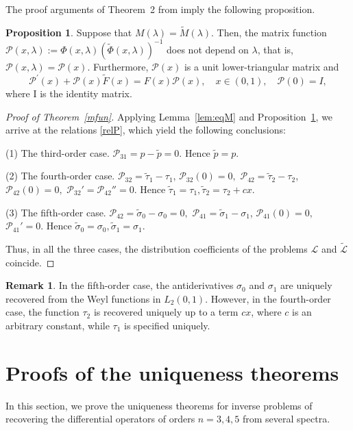 \documentclass[reqno,12pt,centertags]{amsart}
\numberwithin{equation}{section}
\theoremstyle{definition}
\newtheorem{proposition}[theorem]{Proposition}
\newtheorem{remark}{Remark}[section]
\begin{document}
The proof arguments of Theorem~2 from \cite{Bon2} imply the following proposition.

\begin{proposition} \label{prop:P}
Suppose that $M(\lambda) = \tilde M(\lambda)$. Then, the matrix function $\mathcal P(x, \lambda) := \Phi(x, \lambda) (\tilde \Phi(x, \lambda))^{-1}$ does not depend on $\lambda$, that is, $\mathcal P(x, \lambda) = \mathcal P(x)$. Furthermore, $\mathcal P(x)$ is a unit lower-triangular matrix and	
\begin{equation} \label{relP}
\mathcal{P}^{\prime}(x)+\mathcal{P}(x) \tilde{F}(x)=F(x) \mathcal{P}(x), \quad x \in (0,1), \quad \mathcal{P}(0)=I, 
\end{equation}
where I is the identity matrix.
\end{proposition}

\begin{proof}[Proof of Theorem~\ref{mfun}]
	
Applying Lemma~\ref{lem:eqM} and Proposition~\ref{prop:P}, we arrive at the relations \eqref{relP}, which yield the following conclusions:

(1) The third-order case. $\mathcal{P}_{31}=p-\tilde{p}=0$. Hence $\tilde{p}=p.$

(2) The fourth-order case. $\mathcal{P}_{32}=\tilde{\tau}_{1}-\tau_{1}$, $\mathcal{P}_{32}(0)=0,$ $\mathcal{P}_{42}=\tilde{\tau}_{2}-\tau_{2}$, $\mathcal{P}_{42}(0)=0,$ $\mathcal{P}_{32}'=\mathcal{P}_{42}''=0$. Hence $\tilde{\tau}_{1}={\tau}_{1},\tilde{\tau}_{2}={\tau}_{2}+cx.$

(3) The fifth-order case. $\mathcal{P}_{42}=\tilde{\sigma}_{0}-{\sigma}_{0}=0,$ $\mathcal{P}_{41}=\tilde{\sigma}_{1}-\sigma_{1}$, $\mathcal{P}_{41}(0)=0,$
$\mathcal{P}_{41}'=0$. Hence $\tilde{\sigma}_{0}={\sigma}_{0},\tilde{\sigma}_{1}=\sigma_{1}.$

Thus, in all the three cases, the distribution coefficients of the problems $\mathcal L$ and $\tilde{\mathcal L}$ coincide.
\end{proof}

\begin{remark}
In the fifth-order case, the antiderivatives $\sigma_0$ and $\sigma_1$ are uniquely recovered from the Weyl functions in $L_2(0,1)$. However, in the fourth-order case, the function $\tau_2$ is recovered uniquely up to a term $cx$, where $c$ is an arbitrary constant, while $\tau_1$ is specified uniquely.
\end{remark}


\section{Proofs of the uniqueness theorems}\label{proof0}
In this section, we prove the uniqueness theorems for inverse problems of recovering the differential operators of orders $n=3,4,5$ from several spectra.
\end{document}
